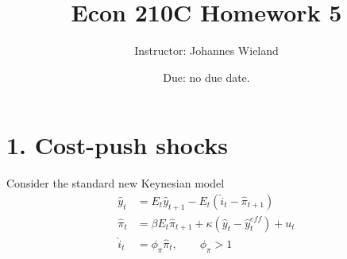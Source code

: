 \documentclass{article}
\newcommand{\1}{\mathbf{1}}
\begin{document}
\title{Econ 210C Homework 5}
\author{Instructor: Johannes Wieland}
\date{\color{red} Due: no due date.}
\maketitle



\section*{1. Cost-push shocks}
Consider the standard new Keynesian model
\begin{align}
	\hat{y}_{t}&=E_{t}\hat{y}_{t+1} - E_{t}(\hat{i}_{t}-\hat{\pi}_{t+1}) \label{nk1} \\
	\hat{\pi}_{t}&=\beta E_{t}\hat{\pi}_{t+1} +\kappa (\hat{y}_{t}-\hat{y}_{t}^{eff}) + u_t \label{nk2} \\
	\hat{i}_{t}&=\phi_\pi \hat{\pi}_t,\qquad \phi_\pi>1 \label{nk3}
\end{align}
\end{document}
